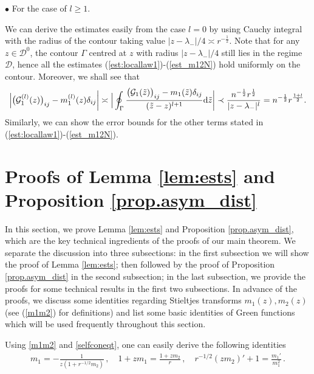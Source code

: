 \documentclass[12pt]{article}
\numberwithin{equation}{section}
\theoremstyle{remark}
\newcommand{\1}{{\rm 1}\kern-0.24em{\rm I}}
\begin{document}
\begin{appendices}
\vspace{0.2cm}
\noindent $\bullet$ For the case of $l\geq 1$.
\vspace{0.2cm}

We can derive the estimates easily from the case $l=0$ by using Cauchy integral with the radius of the contour taking value $|z-\lambda_-|/4\asymp r^{-\frac 12}$. Note that for any $z\in \mathcal{D}^0$, the contour $\Gamma$ centred at $z$ with radius $|z-\lambda_-|/4$ still lies in the regime $\mathcal{D}$, hence all the estimates (\ref{est:locallaw1})-(\ref{est_m12N}) hold uniformly on the contour.  Moreover, we shall see that 
\begin{align*}
\Big|\big( \mathcal{G}_1^{(l)}(z)\big)_{ij} - m_1^{(l)}(z) \delta_{ij} \bigg| \asymp\Big|\oint_{\Gamma} \frac{ \big( \mathcal{G}_1(\tilde z)\big)_{ij} - m_1(\tilde z) \delta_{ij} }{(\tilde z- z)^{l+1}} {\rm d} \tilde z\bigg| \prec  \frac{n^{-\frac 12 } r^{\frac 12}}{|z-\lambda_-|^l} = n^{-\frac 12} r^{\frac{1+l}{2}}.
\end{align*}
Similarly, we can show the error bounds for the other terms stated in  (\ref{est:locallaw1})-(\ref{est_m12N}).



\section{Proofs of Lemma  \ref{lem:ests} and Proposition \ref{prop.asym_dist} } \label{sec:pf_LemProp}



In this section, we prove Lemma \ref{lem:ests} and Proposition \ref{prop.asym_dist}, which are the key technical ingredients of the proofs of our main theorem. We separate the discussion into three subsections: in the first subsection we will 
show the  proof of Lemma \ref{lem:ests}; then followed by the proof of Proposition \ref{prop.asym_dist}  in the second subsection;  in the last subsection, we provide the proofs for some technical results in the first two  subsections. In advance of the proofs, we discuss some identities regarding Stieltjes transforms $m_1(z), m_2(z)$ (see (\ref{m1m2}) for definitions) and list some basic identities of Green functions which will be used frequently throughout this section.

Using \eqref{m1m2} and \eqref{selfconeqt}, one can easily derive the following identities  
\begin{align}
m_1=-\frac{1}{z(1+r^{-1/2}m_2)}\,, \quad 1+zm_1=\frac{1+zm_2}{r}\,, \quad r^{-1/2}(zm_2)'+1=\frac{m_1'}{m_1^2}\,. \label{identitym1m2}
\end{align}


\end{appendices}
\end{document}
